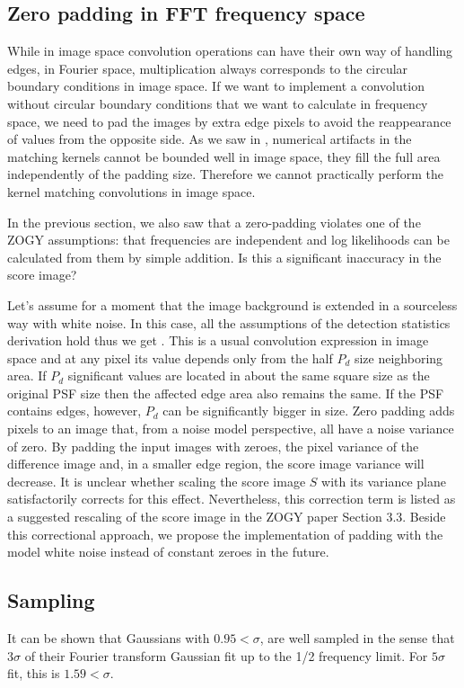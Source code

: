 \subsection{Zero padding in FFT frequency space\label{sec:zeropadS}}
%
\par While in image space convolution operations can have their own
way of handling edges, in Fourier space, multiplication always
corresponds to the circular boundary conditions in image space.  If we
want to implement a convolution without circular boundary
conditions that we want to calculate in frequency space,
we need to pad the images by extra edge pixels to avoid the
reappearance of values from the opposite side.
As we saw in , numerical artifacts in the matching
kernels cannot be bounded well in image space, they fill the full area
independently of the padding size. Therefore we cannot practically perform
the kernel matching convolutions in image space.
%
\par In the previous section, we also saw that a zero-padding violates one
of the ZOGY assumptions: that frequencies are independent and log
likelihoods can be calculated from them by simple addition. Is this a
significant inaccuracy in the score image?
%
\par Let's assume for a moment that the image background is extended in a
sourceless way with white noise. In this case, all the assumptions of the
detection statistics derivation hold thus we get . This is a
usual convolution expression in image space and at any pixel its value
depends only from the half \(P_d\) size neighboring area. If \(P_d\)
significant values are located in about the same square size as the original
PSF size then the affected edge area also remains the same. If the PSF
contains edges, however, \(P_d\) can be significantly bigger in size. Zero
padding adds pixels to an image that, from a noise model perspective, all
have a noise variance of zero. By padding the input images with zeroes, the
pixel variance of the difference image and, in a smaller edge region, the
score image variance will decrease. It is unclear whether scaling the score
image \(S\) with its variance plane satisfactorily corrects for this
effect. Nevertheless, this correction term is listed as a suggested
rescaling of the score image in the ZOGY paper Section 3.3. Beside this
correctional approach, we propose the implementation of padding with the
model white noise instead of constant zeroes in the future.
%
\subsection{Sampling}
\par It can be shown that Gaussians with \(0.95 < \sigma\), are well
sampled in the sense that \(3\sigma\) of their Fourier
transform Gaussian fit up to the 1/2 frequency limit. For
\(5\sigma\) fit, this is \(1.59 < \sigma\).

